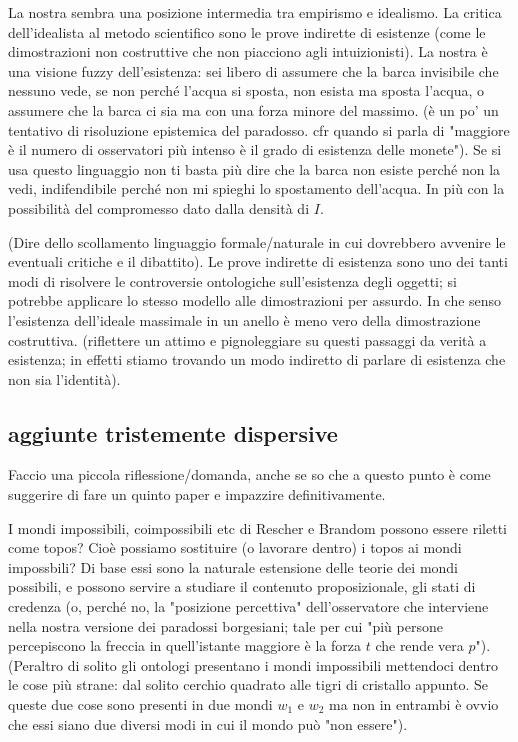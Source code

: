 \documentclass[a4paper, 11pt]{article}
\begin{document}
La nostra sembra una posizione intermedia tra empirismo e idealismo. La critica dell'idealista al metodo scientifico sono le prove indirette di esistenze (come le dimostrazioni non costruttive che non piacciono agli intuizionisti). La nostra è una visione fuzzy dell'esistenza: sei libero di assumere che la barca invisibile che nessuno vede, se non perché l'acqua si sposta, non esista ma sposta l'acqua, o assumere che la barca ci sia ma con una forza minore del massimo. (è un po' un tentativo di risoluzione epistemica del paradosso. cfr quando si parla di "maggiore è il numero di osservatori più intenso è il grado di esistenza delle monete"). Se si usa questo linguaggio non ti basta più dire che la barca non esiste perché non la vedi, indifendibile perché non mi spieghi lo spostamento dell'acqua. In più con la possibilità del compromesso dato dalla densità di $I$. 

(Dire dello scollamento linguaggio formale/naturale in cui dovrebbero avvenire le eventuali critiche e il dibattito). Le prove indirette di esistenza sono uno dei tanti modi di risolvere le controversie ontologiche sull'esistenza degli oggetti; si potrebbe applicare lo stesso modello alle dimostrazioni per assurdo. In che senso l'esistenza dell'ideale massimale in un anello è meno vero della dimostrazione costruttiva. (riflettere un attimo e pignoleggiare su questi passaggi da verità a esistenza; in effetti stiamo trovando un modo indiretto di parlare di esistenza che non sia l'identità). 

  





\subsection{aggiunte tristemente dispersive}

Faccio una piccola riflessione/domanda, anche se so che a questo punto è come suggerire di fare un quinto paper e impazzire definitivamente.

I mondi impossibili, coimpossibili etc di Rescher e Brandom possono essere riletti come topos? Cioè possiamo sostituire (o lavorare dentro) i topos ai mondi impossbili? Di base essi sono la naturale estensione delle teorie dei mondi possibili, e possono servire a studiare il contenuto proposizionale, gli stati di credenza (o, perché no, la "posizione percettiva" dell'osservatore che interviene nella nostra versione dei paradossi borgesiani; tale per cui "più persone percepiscono la freccia in quell'istante maggiore è la forza $t$ che rende vera $p$"). (Peraltro di solito gli ontologi presentano i mondi impossibili mettendoci dentro le cose più strane: dal solito cerchio quadrato alle tigri di cristallo appunto. Se queste due cose sono presenti in due mondi $w_1$ e $w_2$ ma non in entrambi è ovvio che essi siano due diversi modi in cui il mondo può "non essere").
\end{document}
